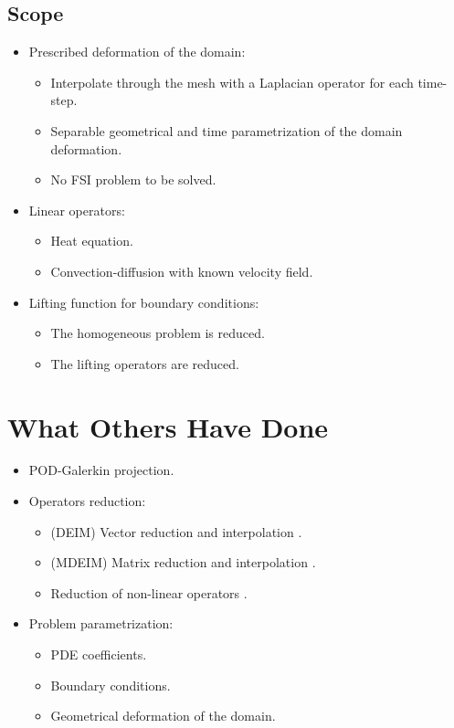 \documentclass[../main.tex]{subfiles}
\begin{document}
\subsection{Scope}
\begin{itemize}
    \item Prescribed deformation of the domain:
    \begin{itemize}
        \item Interpolate through the mesh with a Laplacian operator for each time-step.
        \item Separable geometrical and time parametrization of the domain deformation.
        \item No FSI problem to be solved.
    \end{itemize}
    \item Linear operators:
    \begin{itemize}
        \item Heat equation.
        \item Convection-diffusion with known velocity field. 
    \end{itemize}
    \item Lifting function for boundary conditions:
    \begin{itemize}
        \item The homogeneous problem is reduced.
        \item The lifting operators are reduced. 
    \end{itemize}
\end{itemize}
\section{What Others Have Done}
\begin{itemize}
    \item POD-Galerkin projection.
    \item Operators reduction:
    \begin{itemize}
        \item (DEIM) Vector reduction and interpolation \cite{2010_nonlinearModelReductionDeim_chaturantabut}.
        \item (MDEIM) Matrix reduction and interpolation \cite{2015_efficientModelReductionParametrizedSystemsMatrixDeim_Negri}.
        \item Reduction of non-linear operators \cite{2018_podDeimReducedOrderModelDeformingMeshAeroelasticApplications_Donfrancesco}.
    \end{itemize}
    \item Problem parametrization: 
    \begin{itemize}
        \item PDE coefficients.
        \item Boundary conditions.
        \item Geometrical deformation of the domain.
    \end{itemize}
\end{itemize}
\end{document}
